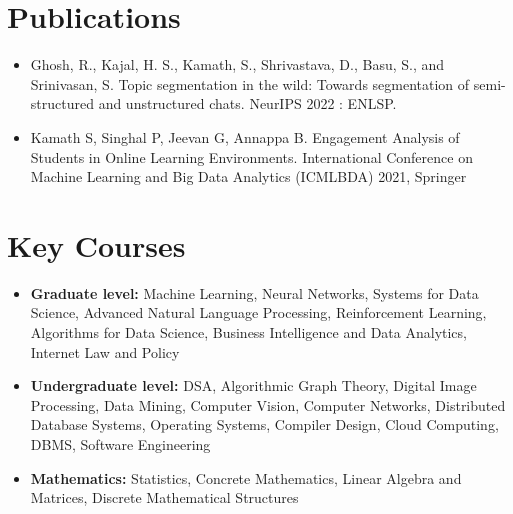 \documentclass{article}
\begin{document}

\section{Publications}
\begin{itemize}
\item Ghosh, R., Kajal, H. S., Kamath, S., Shrivastava, D., Basu, S., and Srinivasan, S. Topic segmentation in the wild: Towards segmentation of semi-structured and unstructured chats. NeurIPS 2022 : ENLSP. 
\item Kamath S, Singhal P, Jeevan G, Annappa B. Engagement Analysis of Students in Online Learning Environments. International Conference on Machine Learning and Big Data Analytics (ICMLBDA) 2021, Springer 

\end{itemize}

\section{Key Courses }

\begin{itemize}
\item \textbf{Graduate level:} Machine Learning, Neural Networks, Systems for Data Science, Advanced Natural Language Processing, Reinforcement Learning, Algorithms for Data Science, Business Intelligence and Data Analytics, Internet Law and Policy
\item \textbf{Undergraduate level:} DSA, Algorithmic Graph Theory, Digital Image Processing, Data Mining, Computer Vision, Computer Networks, Distributed Database Systems, Operating Systems, Compiler Design, Cloud Computing, DBMS, Software Engineering
\item \textbf{Mathematics:} Statistics, Concrete Mathematics, Linear Algebra and Matrices, Discrete Mathematical Structures
\end{itemize}
\end{document}
